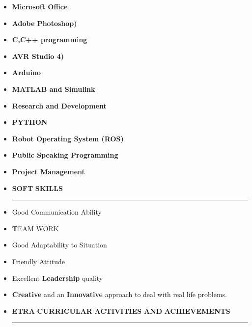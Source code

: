 \documentclass[a4paper]{article}
\begin{document}
 \renewcommand{\labelitemi}{\textbullet}
 \begin{itemize}
  \item \textbf{Microsoft Office}
  \item \textbf{ Adobe Photoshop)}
  \item \textbf{C,C++ programming}  \item \textbf{AVR Studio 4)}  \item \textbf{Arduino}  \item \textbf{MATLAB and Simulink}  \item \textbf{ Research and Development}
 \item \textbf{PYTHON}
 \item \textbf{Robot Operating System (ROS)}
 \item \textbf{Public Speaking Programming}
 \item \textbf{ Project Management}

 \end{itemize}
 
 \renewcommand{\labelitemi}{\texttt{[image: jnj.JPG]}}
\begin{itemize}
  \vspace{4ex}
  \item \textbf{\huge{S}}\textbf{\large OFT} \textbf{\huge{S}}\textbf{\large KILLS}
  {\color{mypink1}
  \rule{\linewidth}{0.5mm}}
 \end{itemize}
 
 \renewcommand{\labelitemi}{\textbullet}
 \begin{itemize}

\item Good Communication Ability \item \textbf TEAM WORK \item Good Adaptability to Situation \item Friendly Attitude
   \item Excellent \textbf{Leadership} quality
   \item \textbf{Creative} and an \textbf{Innovative} approach to deal with real life problems.
 \end{itemize}

 
 \renewcommand{\labelitemi}{\texttt{[image: jnj.JPG]}}
\begin{itemize}
  \vspace{4ex}
  \item \textbf{\huge{E}}\textbf{\large TRA} \textbf{\huge{\-}} \textbf{\huge{C}}\textbf{\large URRICULAR} \textbf{\huge{A}}\textbf{\large CTIVITIES} \textbf{\large   AND} \textbf{\huge{A}}\textbf{\large CHIEVEMENTS}
  {\color{mypink1}
  \rule{\linewidth}{0.5mm}}
 \end{itemize}
 
\end{document}
